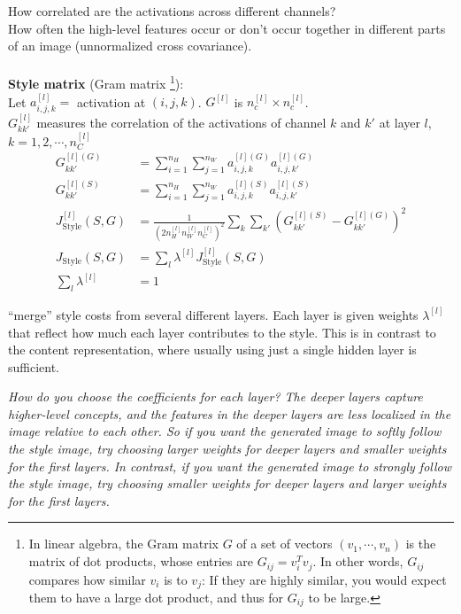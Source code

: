 \begin{enumerate}
\begin{itemize}
    How correlated are the activations across different channels?\\
    How often the high-level features occur or don't occur together in different parts of an image (unnormalized cross covariance).\\
    \\
    \textbf{Style matrix} (Gram matrix \footnote{In linear algebra, the Gram matrix $G$ of a set of vectors  $(v_1, \cdots, v_n)$  is the matrix of dot products, whose entries are  $G_{ij} = v^T_iv_j$. In other words,  $G_{ij}$  compares how similar  $v_i$  is to   $v_j$: If they are highly similar, you would expect them to have a large dot product, and thus for $G_{ij}$ to be large.}):\\
    Let $a^{[l]}_{i,j,k} = $ activation at $(i, j, k)$. $G^{[l]}$ is $n_c^{[l]} \times n_c^{[l]}$.\\
    $G_{kk'}^{[l]}$ measures the correlation of the activations of channel $k$ and $k'$ at layer $l$, $k = 1, 2, \cdots, n_C^{[l]}$
    \begin{align}
    G_{kk'}^{[l](G)} &= \sum_{i = 1}^{n_H}\sum_{j = 1}^{n_W}a^{[l](G)}_{i,j,k}a^{[l](G)}_{i,j,k'}\\
    G_{kk'}^{[l](S)} &= \sum_{i = 1}^{n_H}\sum_{j = 1}^{n_W}a^{[l](S)}_{i,j,k}a^{[l](S)}_{i,j,k'}\\
    J_{\text{Style}}^{[l]}(S, G) &= \frac{1}{(2 n_H^{[l]} n_W^{[l]} n_C^{[l]})^2}\sum_k\sum_{k'}(G_{kk'}^{[l](S)} - G_{kk'}^{[l](G)})^2\\
    J_{\text{Style}}(S, G) &= \sum_{l}\lambda^{[l]} J_{\text{Style}}^{[l]}(S, G)\\
     \sum_{l}\lambda^{[l]} &= 1 \nonumber
    \end{align}
    \end{itemize}
    ``merge'' style costs from several different layers. Each layer is given weights $\lambda^{[l]} $ that reflect how much each layer contributes to the style. This is in contrast to the content representation, where usually using just a single hidden layer is sufficient.
\end{enumerate}

\emph{\textcolor{Bittersweet}{How do you choose the coefficients for each layer? The deeper layers capture higher-level concepts, and the features in the deeper layers are less localized in the image relative to each other. So if you want the generated image to softly follow the style image, try choosing larger weights for deeper layers and smaller weights for the first layers. In contrast, if you want the generated image to strongly follow the style image, try choosing smaller weights for deeper layers and larger weights for the first layers.}}

